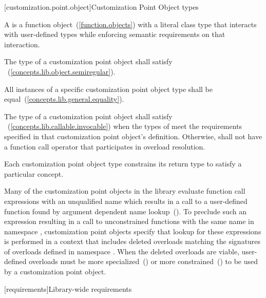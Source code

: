 \setcounter{paragraph}{5}
\begin{addedblock}
[customization.point.object]{Customization Point Object types}

\pnum
A  is a function object~(\ref{function.objects}) with a
literal class type that interacts with user-defined types while
enforcing semantic requirements on that interaction.

\pnum
The type of a customization point object shall satisfy
~(\ref{concepts.lib.object.semiregular}).

\pnum
All instances of a specific customization point object type shall
be equal~(\ref{concepts.lib.general.equality}).

\pnum
The type of a customization point object  shall satisfy
~(\ref{concepts.lib.callable.invocable}) when the types of
 meet the requirements specified in that
customization point object's definition. Otherwise, 
shall not have a function call operator that participates in
overload resolution.

\pnum
Each customization point object type constrains its return type
to satisfy a particular concept.

\pnum
{}

\pnum
\enternote Many of the customization point objects in the library
evaluate function call expressions with an unqualified name which
results in a call to a user-defined function found by argument
dependent name lookup~(). To preclude
such an expression resulting in a call to unconstrained functions
with the same name in namespace , customization point
objects specify that lookup for these expressions is performed in
a context that includes deleted overloads matching the signatures
of overloads defined in namespace . When the deleted
overloads are viable, user-defined overloads must be more
specialized~() or more
constrained~() to be used by a
customization point object. \exitnote
\end{addedblock}

[requirements]{Library-wide requirements}

